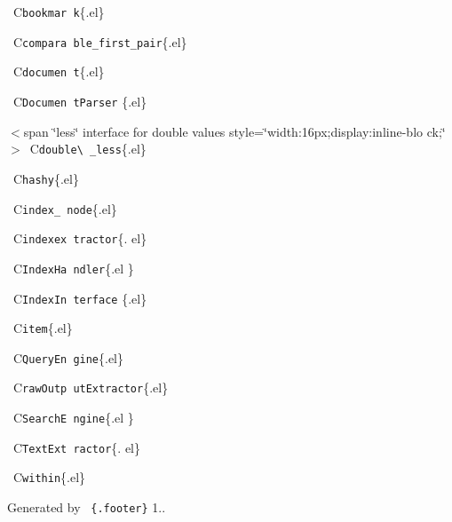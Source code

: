   C{\tt bookmar k}\{.el\}

  C{\tt compara ble\+\_\+first\+\_\+pair}\{.el\}

  C{\tt documen t}\{.el\}

  C{\tt Documen t\+Parser} \{.el\}

 $<$span \char`\"{}less\char`\"{} interface for double values style=\char`\"{}width\+:16px;display\+:inline-\/blo 
  ck;\char`\"{}$>$ C{\tt double\textbackslash{} \+\_\+less}\{.el\}

  C{\tt hashy}\{.el\}

  C{\tt index\+\_\+ node}\{.el\}

  C{\tt indexex tractor}\{. el\}

  C{\tt Index\+Ha ndler}\{.el \}

  C{\tt Index\+In terface} \{.el\}

  C{\tt item}\{.el\}

  C{\tt Query\+En gine}\{.el\}

  C{\tt raw\+Outp ut\+Extractor}\{.el\}

  C{\tt SearchE ngine}\{.el \}

  C{\tt Text\+Ext ractor}\{. el\}

  C{\tt within}\{.el\} 





 



Generated by  {\tt \{.footer\}} 1.. 